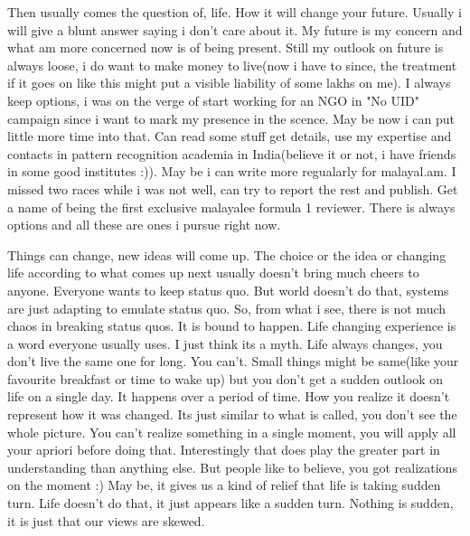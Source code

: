 Then usually comes the question of, life. How it will change your future. Usually i will give a blunt answer saying i don't care about it. My future is my concern and what am more concerned now is of being present. Still my outlook on future is always loose, i do want to make money to live(now i have to since, the treatment if it goes on like this might put a visible liability of some lakhs on me). I always keep options, i was on the verge of start working for an NGO in "No UID" campaign since i want to mark my presence in the scence. May be now i can put little more time into that. Can read some stuff get details, use my expertise and contacts in pattern recognition academia in India(believe it or not, i have friends in some good institutes :)). May be i can write more regualarly for malayal.am. I missed two races while i was not well, can try to report the rest and publish. Get a name of being the first exclusive malayalee formula 1 reviewer. There is always options and all these are ones i pursue right now. 

Things can change, new ideas will come up. The choice or the idea or changing life according to what comes up next usually doesn't bring much cheers to anyone. Everyone wants to keep status quo. But world doesn't do that, systems are just adapting to emulate status quo. So, from what i see, there is not much chaos in breaking status quos. It is bound to happen. Life changing experience is a word everyone usually uses. I just think its a myth. Life always changes, you don't live the same one for long. You can't. Small things might be same(like your favourite breakfast or time to wake up) but you don't get a sudden outlook on life on a single day. It happens over a period of time. How you realize it doesn't represent how it was changed. Its just similar to what is called, you don't see the whole picture. You can't realize something in a single moment, you will apply all your apriori before doing that. Interestingly that does play the greater part in understanding than anything else. But people like to believe, you got realizations on the moment :) May be, it gives us a kind of relief that life is taking sudden turn. Life doesn't do that, it just appears like a sudden turn. Nothing is sudden, it is just that our views are skewed.

\newpage 
